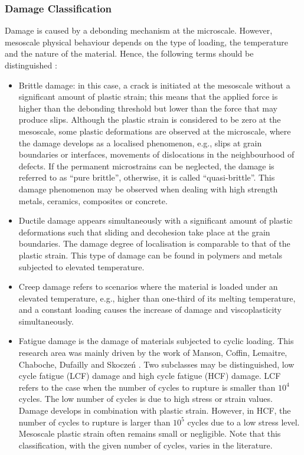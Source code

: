 \subsubsection{Damage Classification}
Damage is caused by a debonding mechanism at the microscale. However, mesoscale physical behaviour depends on the type of loading, the temperature and the nature of the material. Hence, the following terms should be distinguished \parencite{lemaitre1996course}:
\begin{itemize}
	\item Brittle damage: in this case, a crack is initiated at the mesoscale without a significant amount of plastic strain; this means that the applied force is higher than the debonding threshold but lower than the force that may produce slips. Although the plastic strain is considered to be zero at the mesoscale, some plastic deformations are observed at the microscale, where the damage develops as a localised phenomenon, e.g., slips at grain boundaries or interfaces, movements of dislocations in the neighbourhood of defects. If the permanent microstrains can be neglected, the damage is referred to as ``pure brittle'', otherwise, it is called ``quasi-brittle''. This damage phenomenon may be observed when dealing with high strength metals, ceramics, composites or concrete.

	\item  Ductile damage appears simultaneously with a significant amount of plastic deformations such that sliding and decohesion take place at the grain boundaries. The damage degree of localisation is comparable to that of the plastic strain. This type of damage can be found in polymers and metals subjected to elevated temperature.

	\item Creep damage refers to scenarios where the material is loaded under an elevated temperature, e.g., higher than one-third of its melting temperature, and a constant loading causes the increase of damage and viscoplasticity simultaneously.

	\item Fatigue damage is the damage of materials subjected to cyclic loading. This research area was mainly driven by the work of Manson, Coffin, Lemaitre, Chaboche, Dufailly and Skocze\'{n} \parencite{skrzypek2013modeling}. Two subclasses may be distinguished, low cycle fatigue (LCF) damage and high cycle fatigue (HCF) damage. LCF refers to the case when the number of cycles to rupture is smaller than $10^4$ cycles. The low number of cycles is due to high stress or strain values. Damage develops in combination with plastic strain. However, in HCF, the number of cycles to rupture is larger than $10^5$ cycles due to a low stress level. Mesoscale plastic strain often remains small or negligible. Note that this classification, with the given number of cycles, varies in the literature.
\end{itemize}

